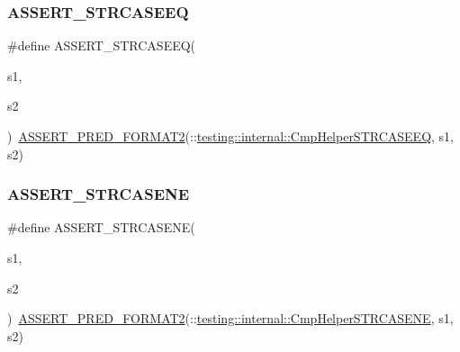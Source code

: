 \subsubsection{\texorpdfstring{ASSERT\_STRCASEEQ}{ASSERT\_STRCASEEQ}}
{\footnotesize\ttfamily \#define A\+S\+S\+E\+R\+T\+\_\+\+S\+T\+R\+C\+A\+S\+E\+EQ(\begin{DoxyParamCaption}\item[{}]{s1,  }\item[{}]{s2 }\end{DoxyParamCaption})~\mbox{\hyperlink{_obj__test_2lib_2googletest-release-1_88_81_2googletest_2include_2gtest_2gtest__pred__impl_8h_ac452685a1a98ea3d96eb956a062ee210}{A\+S\+S\+E\+R\+T\+\_\+\+P\+R\+E\+D\+\_\+\+F\+O\+R\+M\+A\+T2}}(\+::\mbox{\hyperlink{namespacetesting_1_1internal_a30dfeb01f1bc8087c7d05205d5fa75c1}{testing\+::internal\+::\+Cmp\+Helper\+S\+T\+R\+C\+A\+S\+E\+EQ}}, s1, s2)}

\mbox{\label{_obj__test_2lib_2googletest-master_2googletest_2include_2gtest_2gtest_8h_ac3d2c3836b103068a050f32585b2aaad}} 
\subsubsection{\texorpdfstring{ASSERT\_STRCASENE}{ASSERT\_STRCASENE}}
{\footnotesize\ttfamily \#define A\+S\+S\+E\+R\+T\+\_\+\+S\+T\+R\+C\+A\+S\+E\+NE(\begin{DoxyParamCaption}\item[{}]{s1,  }\item[{}]{s2 }\end{DoxyParamCaption})~\mbox{\hyperlink{_obj__test_2lib_2googletest-release-1_88_81_2googletest_2include_2gtest_2gtest__pred__impl_8h_ac452685a1a98ea3d96eb956a062ee210}{A\+S\+S\+E\+R\+T\+\_\+\+P\+R\+E\+D\+\_\+\+F\+O\+R\+M\+A\+T2}}(\+::\mbox{\hyperlink{namespacetesting_1_1internal_a7e31d489f06ab8f6a81a7729f0c377e7}{testing\+::internal\+::\+Cmp\+Helper\+S\+T\+R\+C\+A\+S\+E\+NE}}, s1, s2)}

\mbox{\label{_obj__test_2lib_2googletest-master_2googletest_2include_2gtest_2gtest_8h_a74f4189ea570bab9a65d47104659ef9c}} 
